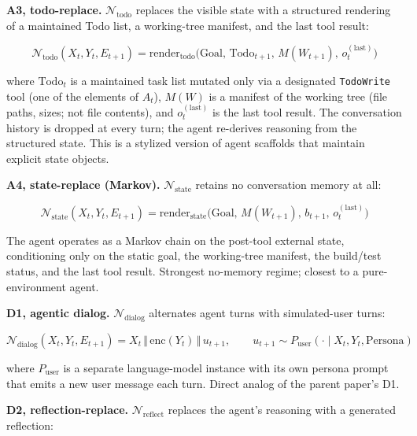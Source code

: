 \documentclass{article}
\theoremstyle{plain}
\theoremstyle{definition}
\begin{document}
\textbf{A3, todo-replace.} $\mathcal{N}_\text{todo}$ replaces the visible state with a structured rendering of a maintained Todo list, a working-tree manifest, and the last tool result:

\begin{equation*}
\mathcal{N}_\text{todo}(X_t, Y_t, E_{t+1}) = \mathrm{render}_\text{todo}\bigl(\text{Goal},\, \mathrm{Todo}_{t+1},\, M(W_{t+1}),\, o_t^{(\text{last})}\bigr)
\end{equation*}

where $\mathrm{Todo}_t$ is a maintained task list mutated only via a designated \texttt{TodoWrite} tool (one of the elements of $A_t$), $M(W)$ is a manifest of the working tree (file paths, sizes; not file contents), and $o_t^{(\text{last})}$ is the last tool result. The conversation history is dropped at every turn; the agent re-derives reasoning from the structured state. This is a stylized version of agent scaffolds that maintain explicit state objects.

\textbf{A4, state-replace (Markov).} $\mathcal{N}_\text{state}$ retains no conversation memory at all:

\begin{equation*}
\mathcal{N}_\text{state}(X_t, Y_t, E_{t+1}) = \mathrm{render}_\text{state}\bigl(\text{Goal},\, M(W_{t+1}),\, b_{t+1},\, o_t^{(\text{last})}\bigr)
\end{equation*}

The agent operates as a Markov chain on the post-tool external state, conditioning only on the static goal, the working-tree manifest, the build/test status, and the last tool result. Strongest no-memory regime; closest to a pure-environment agent.

\textbf{D1, agentic dialog.} $\mathcal{N}_\text{dialog}$ alternates agent turns with simulated-user turns:

\begin{equation*}
\mathcal{N}_\text{dialog}(X_t, Y_t, E_{t+1}) = X_t \,\Vert\, \mathrm{enc}(Y_t) \,\Vert\, u_{t+1}, \qquad u_{t+1} \sim P_\text{user}(\cdot \mid X_t, Y_t, \text{Persona})
\end{equation*}

where $P_\text{user}$ is a separate language-model instance with its own persona prompt that emits a new user message each turn. Direct analog of the parent paper's D1.

\textbf{D2, reflection-replace.} $\mathcal{N}_\text{reflect}$ replaces the agent's reasoning with a generated reflection:
\end{document}
